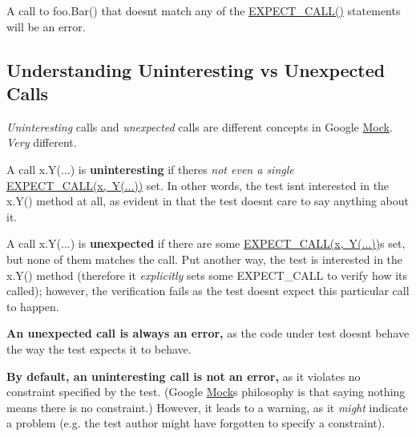 A call to {\ttfamily foo.\+Bar()} that doesn\textquotesingle{}t match any of the {\ttfamily \mbox{\hyperlink{googletest-master_2googlemock_2include_2gmock_2gmock-spec-builders_8h_a535a6156de72c1a2e25a127e38ee5232}{E\+X\+P\+E\+C\+T\+\_\+\+C\+A\+L\+L()}}} statements will be an error.

\subsection*{Understanding Uninteresting vs Unexpected Calls}

{\itshape Uninteresting} calls and {\itshape unexpected} calls are different concepts in Google \mbox{\hyperlink{class_mock}{Mock}}. {\itshape Very} different.

A call {\ttfamily x.\+Y(...)} is {\bfseries{uninteresting}} if there\textquotesingle{}s {\itshape not even a single} {\ttfamily \mbox{\hyperlink{_obj__test_2lib_2googletest-release-1_88_81_2googlemock_2include_2gmock_2gmock-spec-builders_8h_a535a6156de72c1a2e25a127e38ee5232}{E\+X\+P\+E\+C\+T\+\_\+\+C\+A\+L\+L(x, Y(...))}}} set. In other words, the test isn\textquotesingle{}t interested in the {\ttfamily x.\+Y()} method at all, as evident in that the test doesn\textquotesingle{}t care to say anything about it.

A call {\ttfamily x.\+Y(...)} is {\bfseries{unexpected}} if there are some {\ttfamily \mbox{\hyperlink{_obj__test_2lib_2googletest-release-1_88_81_2googlemock_2include_2gmock_2gmock-spec-builders_8h_a535a6156de72c1a2e25a127e38ee5232}{E\+X\+P\+E\+C\+T\+\_\+\+C\+A\+L\+L(x, Y(...))}}s} set, but none of them matches the call. Put another way, the test is interested in the {\ttfamily x.\+Y()} method (therefore it {\itshape explicitly} sets some {\ttfamily E\+X\+P\+E\+C\+T\+\_\+\+C\+A\+LL} to verify how it\textquotesingle{}s called); however, the verification fails as the test doesn\textquotesingle{}t expect this particular call to happen.

{\bfseries{An unexpected call is always an error,}} as the code under test doesn\textquotesingle{}t behave the way the test expects it to behave.

{\bfseries{By default, an uninteresting call is not an error,}} as it violates no constraint specified by the test. (Google \mbox{\hyperlink{class_mock}{Mock}}\textquotesingle{}s philosophy is that saying nothing means there is no constraint.) However, it leads to a warning, as it {\itshape might} indicate a problem (e.\+g. the test author might have forgotten to specify a constraint).

